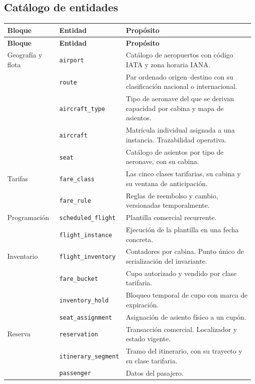 \documentclass[10pt,letterpaper]{article}
\begin{document}
\subsection{Catálogo de entidades}
\begin{longtable}{@{}L{2.6cm} L{3.6cm} L{9.6cm}@{}}
\toprule \textbf{Bloque} & \textbf{Entidad} & \textbf{Propósito} \\ \midrule \endfirsthead
\toprule \textbf{Bloque} & \textbf{Entidad} & \textbf{Propósito} \\ \midrule \endhead
Geografía y flota
 & \texttt{airport} & Catálogo de aeropuertos con código IATA y zona horaria IANA. \\
 & \texttt{route} & Par ordenado origen--destino con su clasificación nacional o internacional. \\
 & \texttt{aircraft\_type} & Tipo de aeronave del que se derivan capacidad por cabina y mapa de asientos. \\
 & \texttt{aircraft} & Matrícula individual asignada a una instancia. Trazabilidad operativa. \\
 & \texttt{seat} & Catálogo de asientos por tipo de aeronave, con su cabina. \\
\midrule
Tarifas
 & \texttt{fare\_class} & Las cinco clases tarifarias, su cabina y su ventana de anticipación. \\
 & \texttt{fare\_rule} & Reglas de reembolso y cambio, versionadas temporalmente. \\
\midrule
Programación
 & \texttt{scheduled\_flight} & Plantilla comercial recurrente. \\
 & \texttt{flight\_instance} & Ejecución de la plantilla en una fecha concreta. \\
\midrule
Inventario
 & \texttt{flight\_inventory} & Contadores por cabina. Punto único de serialización del invariante. \\
 & \texttt{fare\_bucket} & Cupo autorizado y vendido por clase tarifaria. \\
 & \texttt{inventory\_hold} & Bloqueo temporal de cupo con marca de expiración. \\
 & \texttt{seat\_assignment} & Asignación de asiento físico a un cupón. \\
\midrule
Reserva
 & \texttt{reservation} & Transacción comercial. Localizador y estado vigente. \\
 & \texttt{itinerary\_segment} & Tramo del itinerario, con su trayecto y su clase tarifaria. \\
 & \texttt{passenger} & Datos del pasajero. \\

\end{longtable}
\end{document}
